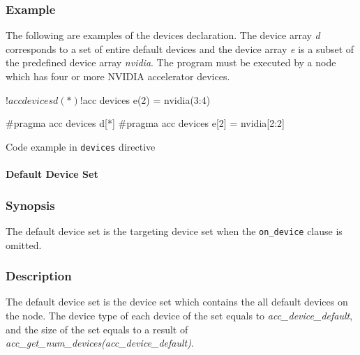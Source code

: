 \subsubsection*{Example}
The following are examples of the devices declaration. The device array {\it d} corresponds to a set of entire default devices and the device array {\it e} is a subset of the predefined device array {\it nvidia}. The program must be executed by a node which has four or more NVIDIA accelerator devices.
%
\begin{myfigure}
\begin{minipage}{0.45\hsize}
\begin{center}
\begin{XACCFexampleL}
!$acc devices d(*)
!$acc devices e(2) = nvidia(3:4)  
\end{XACCFexampleL}
\end{center}
\end{minipage}
%
\begin{minipage}{0.53\hsize}
\begin{center}
\begin{XACCCexampleR}
#pragma acc devices d[*]
#pragma acc devices e[2] = nvidia[2:2]
\end{XACCCexampleR}
\end{center}
\end{minipage}
\caption{Code example in {\XACC} {\tt devices} directive}\label{code:devices}
\end{myfigure}


\paragraph{Default Device Set}
\subsubsection*{Synopsis}
The default device set is the targeting device set when the {\tt on\_device} clause is omitted.

\subsubsection*{Description}
The default device set is the device set which contains the all {\OACC} default devices on the node.
The device type of each device of the set equals to {\it acc\_device\_default}, and the size of the set equals to a result of {\it acc\_get\_num\_devices(acc\_device\_default)}.



